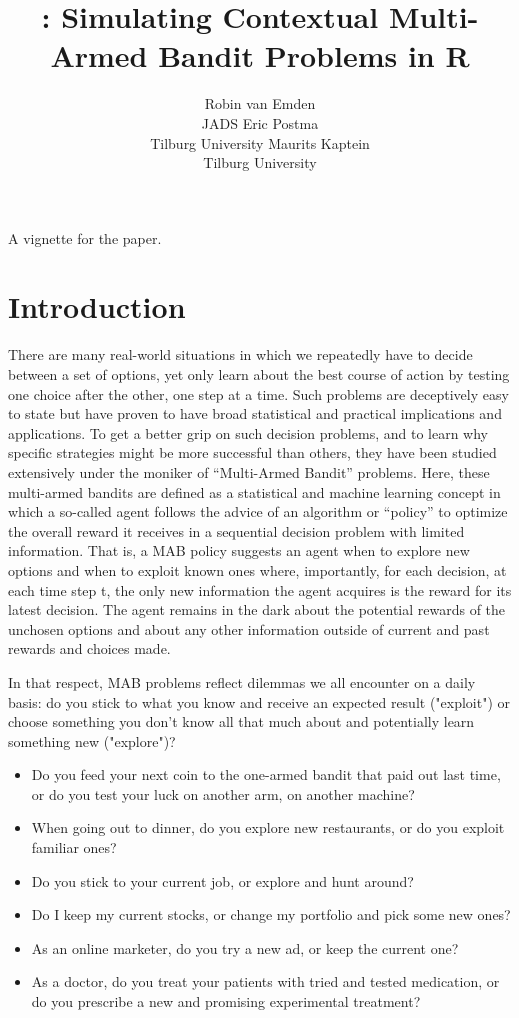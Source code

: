 \documentclass[nojss]{jss}\usepackage[]{graphicx}\usepackage[]{color}
\author{Robin van Emden\\JADS \And
  Eric Postma\\Tilburg University \And
  Maurits Kaptein\\Tilburg University}
\title{\pkg{contextual}: Simulating Contextual Multi-Armed Bandit Problems in R}
\begin{document}
A vignette for the \cite{contextual} paper.








\section{Introduction}

There are many real-world situations in which we repeatedly have to decide between a set of options, yet only learn about the best course of action by testing one choice after the other, one step at a time. Such problems are deceptively easy to state but have proven to have broad statistical and practical implications and applications. To get a better grip on such decision problems, and to learn why specific strategies might be more successful than others, they have been studied extensively under the moniker of \textquotedblleft{}Multi-Armed Bandit\textquotedblright{} problems. Here, these multi-armed bandits are defined as a statistical and machine learning concept in which a so-called agent follows the advice of an algorithm or \textquotedblleft{}policy\textquotedblright{} to optimize the overall reward it receives in a sequential decision problem with limited information. That is, a MAB policy suggests an agent when to explore new options and when to exploit known ones \textendash{} where, importantly, for each decision, at each time step t, the only new information the agent acquires is the reward for its latest decision. The agent remains in the dark about the potential rewards of the unchosen options and about any other information outside of current and past rewards and choices made.


In that respect, MAB problems reflect dilemmas we all encounter on a daily basis: do you stick to what you know and receive an expected result ("exploit") or choose something you don't know all that much about and potentially learn something new ("explore")?

\begin{itemize}
\item Do you feed your next coin to the one-armed bandit that paid out last time, or do you test your luck on another arm, on another machine?
\item When going out to dinner, do you explore new restaurants, or do you exploit familiar ones?
\item Do you stick to your current job, or explore and hunt around?
\item Do I keep my current stocks, or change my portfolio and pick some new ones?
\item As an online marketer, do you try a new ad, or keep the current one?
\item As a doctor, do you treat your patients with tried and tested medication, or do you prescribe a new and promising experimental treatment?
\end{itemize}
\end{document}
